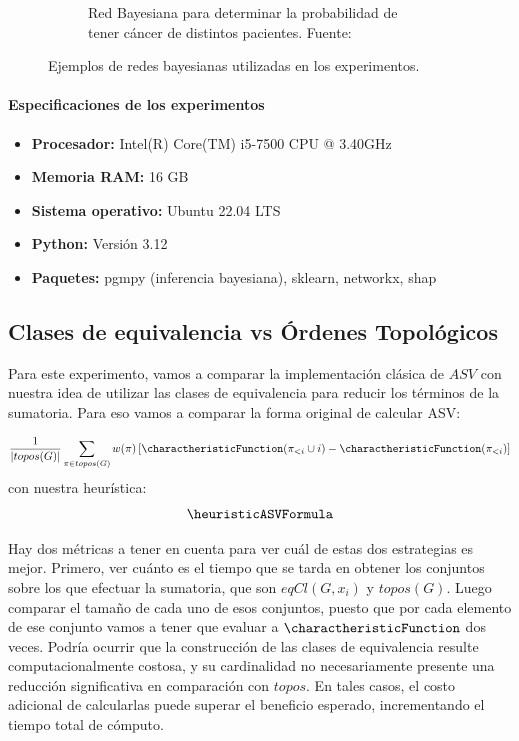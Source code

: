 \begin{figure}[ht]
\begin{subfigure}[b]{0.6\textwidth}
		\caption{Red Bayesiana \cancerNetwork para determinar la probabilidad de tener cáncer de distintos pacientes. Fuente: \cite{childNetwork}}
		\label{fig:child_network}
	\end{subfigure}
	
	\caption{Ejemplos de redes bayesianas utilizadas en los experimentos.}
	\label{fig:bayesian_networks_combined}
\end{figure}

\paragraph{Especificaciones de los experimentos}

\begin{itemize}
	\item \textbf{Procesador:} Intel(R) Core(TM) i5-7500 CPU @ 3.40GHz
	\item \textbf{Memoria RAM:} 16 GB
	\item \textbf{Sistema operativo:} Ubuntu 22.04 LTS
	\item \textbf{Python:} Versión 3.12
	\item  \textbf{Paquetes:} pgmpy (inferencia bayesiana), sklearn, networkx, shap
\end{itemize}

\subsection{Clases de equivalencia vs Órdenes Topológicos}

Para este experimento, vamos a comparar la implementación clásica de $ASV$ con nuestra idea de utilizar las clases de equivalencia para reducir los términos de la sumatoria. Para eso vamos a comparar la forma original de calcular ASV: 

$$\frac{1}{|topos(G)|} \sum_{\pi \in topos(G)} w(\pi) \left[ \charactheristicFunction(\pi_{<i} \cup {i}) - \charactheristicFunction(\pi_{<i}) \right] $$
con nuestra heurística:
$$\heuristicASVFormula$$

Hay dos métricas a tener en cuenta para ver cuál de estas dos estrategias es mejor. Primero, ver cuánto es el tiempo que se tarda en obtener los conjuntos sobre los que efectuar la sumatoria, que son $eqCl(G, x_i)$ y $topos(G)$. Luego comparar el tamaño de cada uno de esos conjuntos, puesto que por cada elemento de ese conjunto vamos a tener que evaluar a $\charactheristicFunction$ dos veces. Podría ocurrir que la construcción de las clases de equivalencia resulte computacionalmente costosa, y su cardinalidad no necesariamente presente una reducción significativa en comparación con $topos$. En tales casos, el costo adicional de calcularlas puede superar el beneficio esperado, incrementando el tiempo total de cómputo.

